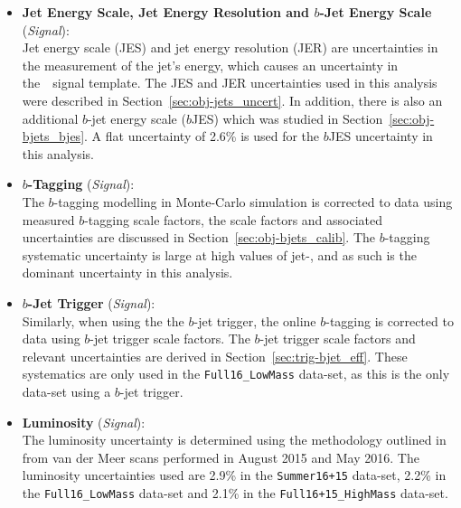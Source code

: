 \begin{itemize}[leftmargin=*]
\item\textbf{Jet Energy Scale, Jet Energy Resolution  and $b$-Jet Energy Scale} \hspace{1mm} (\textit{Signal}):\\
  Jet energy scale (JES) and jet energy resolution (JER) are uncertainties in the measurement of the jet's energy,
  which causes an uncertainty in the~\mjj~signal template.
  The JES and JER uncertainties used in this analysis were described in Section~\ref{sec:obj-jets_uncert}.
  In addition, there is also an additional $b$-jet energy scale ($b$JES) which was studied in Section~\ref{sec:obj-bjets_bjes}.
  A flat uncertainty of 2.6\% is used for the $b$JES uncertainty in this analysis.
  \vspace{0.5em}
\item\textbf{$b$-Tagging} \hspace{1mm} (\textit{Signal}):\\
  The $b$-tagging modelling in Monte-Carlo simulation is corrected to data using measured $b$-tagging scale factors,
  the scale factors and associated uncertainties are discussed in Section~\ref{sec:obj-bjets_calib}.
  The $b$-tagging systematic uncertainty is large at high values of jet-\pT, and as such is the dominant uncertainty in this analysis.
  \vspace{0.5em}
\item\textbf{$b$-Jet Trigger} \hspace{1mm} (\textit{Signal}):\\
  Similarly, when using the the $b$-jet trigger, the online $b$-tagging is corrected to data using
  $b$-jet trigger scale factors.
  The $b$-jet trigger scale factors and relevant uncertainties are derived in Section~\ref{sec:trig-bjet_eff}.
  These systematics are only used in the \verb|Full16_LowMass| data-set, as this is the only data-set using a $b$-jet trigger.
  \vspace{0.5em}
\item\textbf{Luminosity} \hspace{1mm} (\textit{Signal}):\\
  The luminosity uncertainty is determined using the methodology outlined in~\cite{lim-syst_lumi}
  from van der Meer scans performed in August 2015 and May 2016.
  The luminosity uncertainties used are 2.9\% in the \verb|Summer16+15| data-set,
  2.2\% in the \verb|Full16_LowMass| data-set
  and 2.1\% in the \verb|Full16+15_HighMass| data-set.
  \vspace{0.5em}

\end{itemize}
